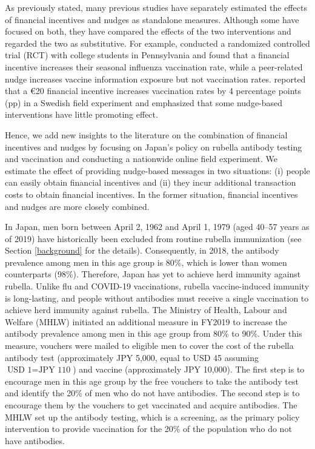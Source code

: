 \documentclass[
  11pt,
  a4paper
]{article}
\begin{document}
As previously stated, many previous studies have separately estimated the effects of financial incentives \citep{Banerjee2010, Barber2022, Barham2009, Brehm2022} and nudges \citep{Dai2021, Chapman2010, Milkman2021, Sasaki2022} as standalone measures. Although some have focused on both, they have compared the effects of the two interventions and regarded the two as substitutive. For example, \citet{Bronchetti2015} conducted a randomized controlled trial (RCT) with college students in Pennsylvania and found that a financial incentive increases their seasonal influenza vaccination rate, while a peer-related nudge increases vaccine information exposure but not vaccination rates. \citet{Campos-Mercade2021a} reported that a €20 financial incentive increases vaccination rates by 4 percentage points (pp) in a Swedish field experiment and emphasized that some nudge-based interventions have little promoting effect.

Hence, we add new insights to the literature on the combination of financial incentives and nudges by focusing on Japan's policy on rubella antibody testing and vaccination and conducting a nationwide online field experiment. We estimate the effect of providing nudge-based messages in two situations: (i) people can easily obtain financial incentives and (ii) they incur additional transaction costs to obtain financial incentives. In the former situation, financial incentives and nudges are more closely combined.

In Japan, men born between April 2, 1962 and April 1, 1979 (aged 40--57 years as of 2019) have historically been excluded from routine rubella immunization (see Section \ref{background} for the details). Consequently, in 2018, the antibody prevalence among men in this age group is 80\%, which is lower than women counterparts (98\%). Therefore, Japan has yet to achieve herd immunity against rubella. Unlike flu and COVID-19 vaccinations, rubella vaccine-induced immunity is long-lasting, and people without antibodies must receive a single vaccination to achieve herd immunity against rubella. The Ministry of Health, Labour and Welfare (MHLW) initiated an additional measure in FY2019 to increase the antibody prevalence among men in this age group from 80\% to 90\%. Under this measure, vouchers were mailed to eligible men to cover the cost of the rubella antibody test (approximately JPY 5,000, equal to USD 45 assuming \(\text{USD 1} = \text{JPY 110}\)) and vaccine (approximately JPY 10,000). The first step is to encourage men in this age group by the free vouchers to take the antibody test and identify the 20\% of men who do not have antibodies. The second step is to encourage them by the vouchers to get vaccinated and acquire antibodies. The MHLW set up the antibody testing, which is a screening, as the primary policy intervention to provide vaccination for the 20\% of the population who do not have antibodies.
\end{document}
